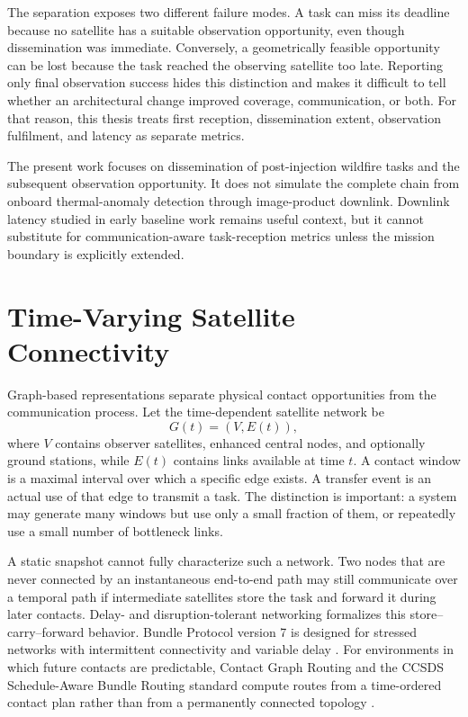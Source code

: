 The separation exposes two different failure modes. A task can miss its deadline because no satellite has a suitable observation opportunity, even though dissemination was immediate. Conversely, a geometrically feasible opportunity can be lost because the task reached the observing satellite too late. Reporting only final observation success hides this distinction and makes it difficult to tell whether an architectural change improved coverage, communication, or both. For that reason, this thesis treats first reception, dissemination extent, observation fulfilment, and latency as separate metrics.

The present work focuses on dissemination of post-injection wildfire tasks and the subsequent observation opportunity. It does not simulate the complete chain from onboard thermal-anomaly detection through image-product downlink. Downlink latency studied in early baseline work remains useful context, but it cannot substitute for communication-aware task-reception metrics unless the mission boundary is explicitly extended.

\section{Time-Varying Satellite Connectivity}

Graph-based representations separate physical contact opportunities from the communication process. Let the time-dependent satellite network be
\begin{equation}
G(t) = \left(V,E(t)\right),
\end{equation}
where $V$ contains observer satellites, enhanced central nodes, and optionally ground stations, while $E(t)$ contains links available at time $t$. A contact window is a maximal interval over which a specific edge exists. A transfer event is an actual use of that edge to transmit a task. The distinction is important: a system may generate many windows but use only a small fraction of them, or repeatedly use a small number of bottleneck links.

A static snapshot cannot fully characterize such a network. Two nodes that are never connected by an instantaneous end-to-end path may still communicate over a temporal path if intermediate satellites store the task and forward it during later contacts. Delay- and disruption-tolerant networking formalizes this store--carry--forward behavior. Bundle Protocol version 7 is designed for stressed networks with intermittent connectivity and variable delay \citep{Burleigh2022}. For environments in which future contacts are predictable, Contact Graph Routing and the CCSDS Schedule-Aware Bundle Routing standard compute routes from a time-ordered contact plan rather than from a permanently connected topology \citep{Burleigh2008,Araniti2015,CCSDS2019}.

